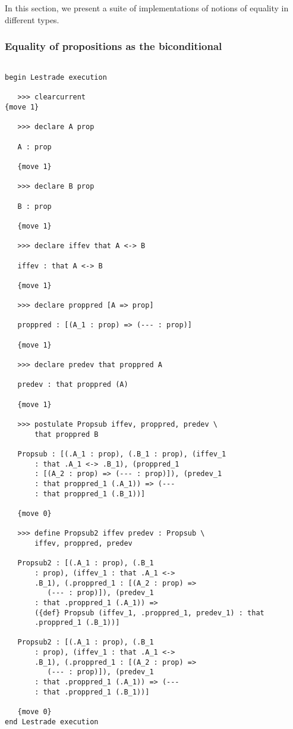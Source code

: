 \documentclass[12pt]{article}
\begin{document}
In this section, we present a suite of implementations of notions of equality in different types.

\subsubsection{Equality of propositions as the biconditional}

\begin{verbatim}

begin Lestrade execution

   >>> clearcurrent
{move 1}

   >>> declare A prop

   A : prop

   {move 1}

   >>> declare B prop

   B : prop

   {move 1}

   >>> declare iffev that A <-> B

   iffev : that A <-> B

   {move 1}

   >>> declare proppred [A => prop]

   proppred : [(A_1 : prop) => (--- : prop)]

   {move 1}

   >>> declare predev that proppred A

   predev : that proppred (A)

   {move 1}

   >>> postulate Propsub iffev, proppred, predev \
       that proppred B

   Propsub : [(.A_1 : prop), (.B_1 : prop), (iffev_1 
       : that .A_1 <-> .B_1), (proppred_1 
       : [(A_2 : prop) => (--- : prop)]), (predev_1 
       : that proppred_1 (.A_1)) => (--- 
       : that proppred_1 (.B_1))]

   {move 0}

   >>> define Propsub2 iffev predev : Propsub \
       iffev, proppred, predev

   Propsub2 : [(.A_1 : prop), (.B_1 
       : prop), (iffev_1 : that .A_1 <-> 
       .B_1), (.proppred_1 : [(A_2 : prop) => 
          (--- : prop)]), (predev_1 
       : that .proppred_1 (.A_1)) => 
       ({def} Propsub (iffev_1, .proppred_1, predev_1) : that 
       .proppred_1 (.B_1))]

   Propsub2 : [(.A_1 : prop), (.B_1 
       : prop), (iffev_1 : that .A_1 <-> 
       .B_1), (.proppred_1 : [(A_2 : prop) => 
          (--- : prop)]), (predev_1 
       : that .proppred_1 (.A_1)) => (--- 
       : that .proppred_1 (.B_1))]

   {move 0}
end Lestrade execution

\end{verbatim}
\end{document}
